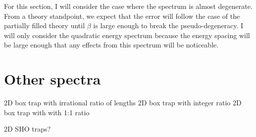 For this section, I will consider the case where the spectrum is almost degenerate. From a theory standpoint, we expect that the error will follow the case of the partially filled theory until $\beta$ is large enough to break the pseudo-degeneracy. I will only consider the quadratic energy spectrum because the energy spacing will be large enough that any effects from this spectrum will be noticeable. 



\section{Other spectra}  
2D box trap with irrational ratio of lengths
2D box trap with integer ratio
2D box trap with with 1:1 ratio

2D SHO traps?
